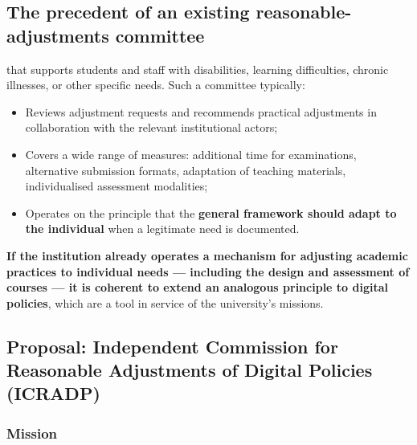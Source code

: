 \subsection{The precedent of an existing reasonable-adjustments committee}

 that supports
students and staff with disabilities, learning difficulties,
chronic illnesses, or other specific
needs. Such a committee typically:

\begin{itemize}[nosep]
    \item Reviews adjustment requests and recommends practical
    adjustments in collaboration with the relevant institutional actors;
    \item Covers a wide range of measures: additional time for
    examinations, alternative submission formats, adaptation of
    teaching materials, individualised assessment modalities;
    \item Operates on the principle that the \textbf{general framework
    should adapt to the individual} when a legitimate need is
    documented.
\end{itemize}

\textbf{If the institution already operates a mechanism for adjusting
academic practices to individual needs --- including the design and
assessment of courses --- it is coherent to extend an analogous
principle to digital policies}, which are a tool in service of
the university's missions.

\subsection{Proposal: Independent Commission for Reasonable Adjustments of Digital Policies (ICRADP)}

\subsubsection{Mission}

